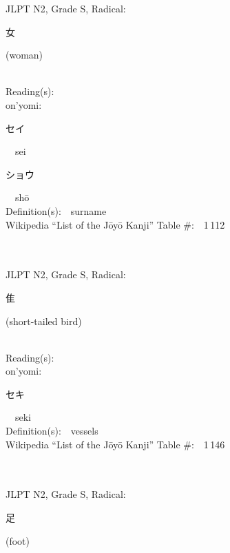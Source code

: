 \begin{multicols}{2}
{JLPT N2, Grade S, Radical:\ \ {\begin{CJK}{UTF8}{min} 女 \end{CJK}} (woman) } \\
Reading(s):\ \ \\
{\hspace*{1em}}on'yomi:\ \ \\
{\hspace*{2em}}{\begin{CJK}{UTF8}{min} セイ \end{CJK}}\ \ sei\ \ \\
{\hspace*{2em}}{\begin{CJK}{UTF8}{min} ショウ \end{CJK}}\ \ sh\=o\ \ \\
Definition(s):\ \ surname \\
Wikipedia ``List of the J\=oy\=o Kanji'' Table \#:\ \ 1\,112 \\
\ \ \\
{\fontsize{34pt}{40pt}  }\ \ \\  %
{JLPT N2, Grade S, Radical:\ \ {\begin{CJK}{UTF8}{min} 隹 \end{CJK}} (short-tailed bird) } \\
Reading(s):\ \ \\
{\hspace*{1em}}on'yomi:\ \ \\
{\hspace*{2em}}{\begin{CJK}{UTF8}{min} セキ \end{CJK}}\ \ seki\ \ \\
Definition(s):\ \ vessels \\
Wikipedia ``List of the J\=oy\=o Kanji'' Table \#:\ \ 1\,146 \\
\ \ \\
{\fontsize{34pt}{40pt}  }\ \ \\  %
{JLPT N2, Grade S, Radical:\ \ {\begin{CJK}{UTF8}{min} 足 \end{CJK}} (foot) } \\

\end{multicols}
